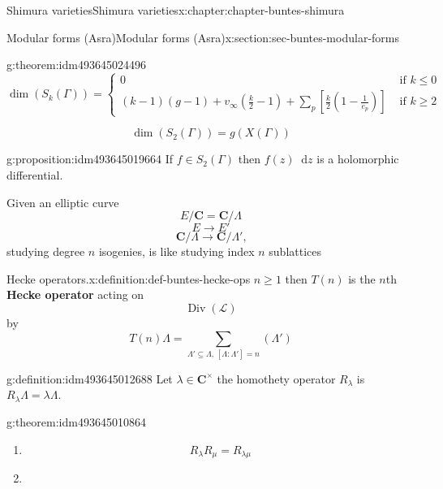 \documentclass[oneside,10pt,]{book}
\newcommand{\terminology}[1]{\textbf{#1}}
\numberwithin{equation}{section}
\newcommand{\diff}{\mathop{}\!\mathrm{d}}
\newcommand{\CC}{\mathbf{C}}
\DeclareMathOperator{\divisors}{Div}
\newcommand{\amp}{&}
\begin{document}
\begin{chapterptx}{Shimura varieties}{}{Shimura varieties}{}{}{x:chapter:chapter-buntes-shimura}
\begin{sectionptx}{Modular forms (Asra)}{}{Modular forms (Asra)}{}{}{x:section:sec-buntes-modular-forms}
\begin{theorem}{}{}{g:theorem:idm493645024496}
\begin{equation*}
\dim(S_k(\Gamma)) =
\begin{cases}
0 \amp \text{ if } k \le 0 \\
(k-1)(g-1) + v_\infty (\frac k2 - 1) + \sum_p [\frac k2 (1- \frac{1}{e_p})] \amp \text{ if } k \ge 2
\end{cases}
\end{equation*}
%
\end{theorem}
%
\begin{equation*}
\dim(S_2(\Gamma)) = g(X(\Gamma))
\end{equation*}
%
\begin{proposition}{}{}{g:proposition:idm493645019664}%
If \(f \in S_2(\Gamma)\) then \(f(z) \diff z\) is a holomorphic differential.%
\end{proposition}
Given an elliptic curve%
\begin{equation*}
E/  \CC = \CC/\Lambda
\end{equation*}
%
\begin{equation*}
E \to E'
\end{equation*}
%
\begin{equation*}
\CC/\Lambda \to \CC/\Lambda'\text{,}
\end{equation*}
studying degree \(n\) isogenies, is like studying index  \(n \) sublattices%
\begin{definition}{Hecke operators.}{x:definition:def-buntes-hecke-ops}%
\(n \ge 1\) then \(T(n)\) is the  \(n\)th \terminology{Hecke operator} acting on%
\begin{equation*}
\divisors (\mathcal L)
\end{equation*}
by%
\begin{equation*}
T(n) \Lambda = \sum_{\Lambda' \subseteq \Lambda,\,[\Lambda : \Lambda'] = n} (\Lambda')
\end{equation*}
%
\end{definition}
\begin{definition}{}{g:definition:idm493645012688}%
Let \(\lambda \in \CC^\times\) the homothety operator \(R_\lambda\) is \(R_\lambda \Lambda = \lambda\Lambda\).%
\end{definition}
\begin{theorem}{}{}{g:theorem:idm493645010864}%
%
\begin{enumerate}
\item{}%
\begin{equation*}
R_\lambda R_\mu = R_{\lambda\mu}
\end{equation*}
%
\item{}%

\end{enumerate}
\end{theorem}
\end{sectionptx}
\end{chapterptx}
\end{document}
